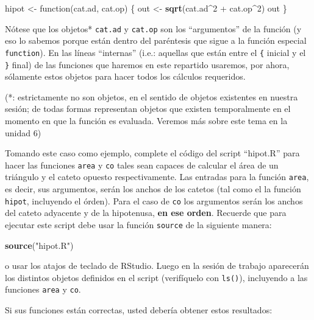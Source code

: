 \documentclass[]{article}
\newenvironment{Shaded}{}{}
\newcommand{\KeywordTok}[1]{\textcolor[rgb]{0.00,0.44,0.13}{\textbf{{#1}}}}
\newcommand{\DecValTok}[1]{\textcolor[rgb]{0.25,0.63,0.44}{{#1}}}
\newcommand{\StringTok}[1]{\textcolor[rgb]{0.25,0.44,0.63}{{#1}}}
\newcommand{\NormalTok}[1]{{#1}}
\begin{document}
\begin{Shaded}
\begin{Highlighting}[]
\NormalTok{hipot <- function(cat.ad, cat.op) \{}
    \NormalTok{out <- }\KeywordTok{sqrt}\NormalTok{(cat.ad^}\DecValTok{2} \NormalTok{+ cat.op^}\DecValTok{2}\NormalTok{)}
    \NormalTok{out}
\NormalTok{\}}
\end{Highlighting}
\end{Shaded}
Nótese que los objetos* \texttt{cat.ad} y \texttt{cat.op} son los
``argumentos'' de la función (y eso lo sabemos porque están dentro del
paréntesis que sigue a la función especial \texttt{function}). En las
líneas ``internas'' (i.e.: aquellas que están entre el \texttt{\{}
inicial y el \texttt{\}} final) de las funciones que haremos en este
repartido usaremos, por ahora, sólamente estos objetos para hacer todos
los cálculos requeridos.

(*: estrictamente no son objetos, en el sentido de objetos existentes en
nuestra sesión; de todas formas representan objetos que existen
temporalmente en el momento en que la función es evaluada. Veremos más
sobre este tema en la unidad 6)

Tomando este caso como ejemplo, complete el código del script
``hipot.R'' para hacer las funciones \texttt{area} y \texttt{co} tales
sean capaces de calcular el área de un triángulo y el cateto opuesto
respectivamente. Las entradas para la función \texttt{area}, es decir,
sus argumentos, serán los anchos de los catetos (tal como el la función
\texttt{hipot}, incluyendo el órden). Para el caso de \texttt{co} los
argumentos serán los anchos del cateto adyacente y de la hipotenusa,
\textbf{en ese orden}. Recuerde que para ejecutar este script debe usar
la función \texttt{source} de la siguiente manera:

\begin{Shaded}
\begin{Highlighting}[]
\KeywordTok{source}\NormalTok{(}\StringTok{"hipot.R"}\NormalTok{)}
\end{Highlighting}
\end{Shaded}
o usar los atajos de teclado de RStudio. Luego en la sesión de trabajo
aparecerán los distintos objetos definidos en el script (verifíquelo con
\texttt{ls()}), incluyendo a las funciones \texttt{area} y \texttt{co}.

Si sus funciones están correctas, usted debería obtener estos
resultados:
\end{document}
